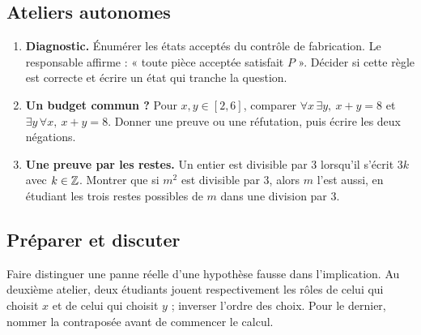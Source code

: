 \subsection{Ateliers autonomes}
\begin{enumerate}
\item \textbf{Diagnostic.} Énumérer les états acceptés du contrôle de fabrication. Le responsable affirme : « toute pièce acceptée satisfait $P$ ». Décider si cette règle est correcte et écrire un état qui tranche la question.
\item \textbf{Un budget commun ?} Pour $x,y\in[2,6]$, comparer $\forall x\,\exists y,\ x+y=8$ et $\exists y\,\forall x,\ x+y=8$. Donner une preuve ou une réfutation, puis écrire les deux négations.
\item \textbf{Une preuve par les restes.} Un entier est divisible par 3 lorsqu'il s'écrit $3k$ avec $k\in\mathbb{Z}$. Montrer que si $m^2$ est divisible par 3, alors $m$ l'est aussi, en étudiant les trois restes possibles de $m$ dans une division par 3.
\end{enumerate}
\ifprof
\subsection{Préparer et discuter}
Faire distinguer une panne réelle d'une hypothèse fausse dans l'implication. Au deuxième atelier, deux étudiants jouent respectivement les rôles de celui qui choisit $x$ et de celui qui choisit $y$ ; inverser l'ordre des choix. Pour le dernier, nommer la contraposée avant de commencer le calcul.

\fi
